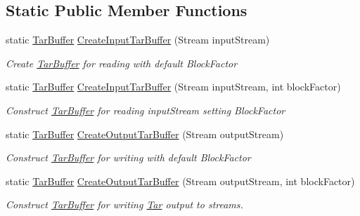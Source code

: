 \subsection*{Static Public Member Functions}
\begin{DoxyCompactItemize}
\item 
static \hyperlink{class_i_c_sharp_code_1_1_sharp_zip_lib_1_1_tar_1_1_tar_buffer}{Tar\+Buffer} \hyperlink{class_i_c_sharp_code_1_1_sharp_zip_lib_1_1_tar_1_1_tar_buffer_ac0e1b010972b90d39c6c10df8bdae0ee}{Create\+Input\+Tar\+Buffer} (Stream input\+Stream)
\begin{DoxyCompactList}\small\item\em Create \hyperlink{class_i_c_sharp_code_1_1_sharp_zip_lib_1_1_tar_1_1_tar_buffer}{Tar\+Buffer} for reading with default Block\+Factor \end{DoxyCompactList}\item 
static \hyperlink{class_i_c_sharp_code_1_1_sharp_zip_lib_1_1_tar_1_1_tar_buffer}{Tar\+Buffer} \hyperlink{class_i_c_sharp_code_1_1_sharp_zip_lib_1_1_tar_1_1_tar_buffer_a9efbbf43f0a6a27db9962379db71ece4}{Create\+Input\+Tar\+Buffer} (Stream input\+Stream, int block\+Factor)
\begin{DoxyCompactList}\small\item\em Construct \hyperlink{class_i_c_sharp_code_1_1_sharp_zip_lib_1_1_tar_1_1_tar_buffer}{Tar\+Buffer} for reading input\+Stream setting Block\+Factor \end{DoxyCompactList}\item 
static \hyperlink{class_i_c_sharp_code_1_1_sharp_zip_lib_1_1_tar_1_1_tar_buffer}{Tar\+Buffer} \hyperlink{class_i_c_sharp_code_1_1_sharp_zip_lib_1_1_tar_1_1_tar_buffer_a4c89266b04551c24a3ba0d44be404395}{Create\+Output\+Tar\+Buffer} (Stream output\+Stream)
\begin{DoxyCompactList}\small\item\em Construct \hyperlink{class_i_c_sharp_code_1_1_sharp_zip_lib_1_1_tar_1_1_tar_buffer}{Tar\+Buffer} for writing with default Block\+Factor \end{DoxyCompactList}\item 
static \hyperlink{class_i_c_sharp_code_1_1_sharp_zip_lib_1_1_tar_1_1_tar_buffer}{Tar\+Buffer} \hyperlink{class_i_c_sharp_code_1_1_sharp_zip_lib_1_1_tar_1_1_tar_buffer_a014b9836e186c6bc0a4b00b486ddd047}{Create\+Output\+Tar\+Buffer} (Stream output\+Stream, int block\+Factor)
\begin{DoxyCompactList}\small\item\em Construct \hyperlink{class_i_c_sharp_code_1_1_sharp_zip_lib_1_1_tar_1_1_tar_buffer}{Tar\+Buffer} for writing \hyperlink{namespace_i_c_sharp_code_1_1_sharp_zip_lib_1_1_tar}{Tar} output to streams. \end{DoxyCompactList}\item 

\end{DoxyCompactItemize}
